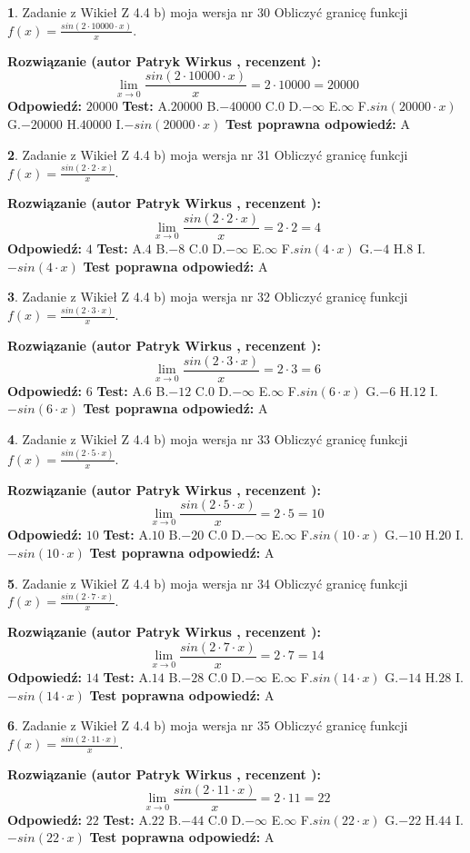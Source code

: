 \documentclass[12pt, a4paper]{article}
\theoremstyle{definition} %
\newtheorem{zad}{}
\newcommand{\zadStart}[1]{\begin{zad}#1\newline}
\newcommand{\zadStop}{\end{zad}}
\newcommand{\rozwStart}[2]{\noindent \textbf{Rozwiązanie (autor #1 , recenzent #2): }\newline}
\newcommand{\rozwStop}{\newline}
\newcommand{\odpStart}{\noindent \textbf{Odpowiedź:}\newline}
\newcommand{\odpStop}{\newline}
\newcommand{\testStart}{\noindent \textbf{Test:}\newline}
\newcommand{\testStop}{\newline}
\newcommand{\kluczStart}{\noindent \textbf{Test poprawna odpowiedź:}\newline}
\newcommand{\kluczStop}{\newline}
\begin{document}
\zadStart{Zadanie z Wikieł Z 4.4 b) moja wersja nr 30}
Obliczyć granicę funkcji $f(x)=\frac{sin(2 \cdot10000\cdot x)}{x}$.
\zadStop
\rozwStart{Patryk Wirkus}{}
$$\lim\limits_{x\to 0}\frac{sin(2 \cdot 10000\cdot x)}{x}=
2 \cdot 10000 = 20000$$
\rozwStop
\odpStart
$20000$
\odpStop
\testStart
A.$20000$
B.$-40000$
C.$0$
D.$-\infty$
E.$\infty$
F.$sin(20000\cdot x)$
G.$-20000$
H.$40000$
I.$-sin(20000\cdot x)$
\testStop
\kluczStart
A
\kluczStop



\zadStart{Zadanie z Wikieł Z 4.4 b) moja wersja nr 31}
Obliczyć granicę funkcji $f(x)=\frac{sin(2 \cdot2\cdot x)}{x}$.
\zadStop
\rozwStart{Patryk Wirkus}{}
$$\lim\limits_{x\to 0}\frac{sin(2 \cdot 2\cdot x)}{x}=
2 \cdot 2 = 4$$
\rozwStop
\odpStart
$4$
\odpStop
\testStart
A.$4$
B.$-8$
C.$0$
D.$-\infty$
E.$\infty$
F.$sin(4\cdot x)$
G.$-4$
H.$8$
I.$-sin(4\cdot x)$
\testStop
\kluczStart
A
\kluczStop



\zadStart{Zadanie z Wikieł Z 4.4 b) moja wersja nr 32}
Obliczyć granicę funkcji $f(x)=\frac{sin(2 \cdot3\cdot x)}{x}$.
\zadStop
\rozwStart{Patryk Wirkus}{}
$$\lim\limits_{x\to 0}\frac{sin(2 \cdot 3\cdot x)}{x}=
2 \cdot 3 = 6$$
\rozwStop
\odpStart
$6$
\odpStop
\testStart
A.$6$
B.$-12$
C.$0$
D.$-\infty$
E.$\infty$
F.$sin(6\cdot x)$
G.$-6$
H.$12$
I.$-sin(6\cdot x)$
\testStop
\kluczStart
A
\kluczStop



\zadStart{Zadanie z Wikieł Z 4.4 b) moja wersja nr 33}
Obliczyć granicę funkcji $f(x)=\frac{sin(2 \cdot5\cdot x)}{x}$.
\zadStop
\rozwStart{Patryk Wirkus}{}
$$\lim\limits_{x\to 0}\frac{sin(2 \cdot 5\cdot x)}{x}=
2 \cdot 5 = 10$$
\rozwStop
\odpStart
$10$
\odpStop
\testStart
A.$10$
B.$-20$
C.$0$
D.$-\infty$
E.$\infty$
F.$sin(10\cdot x)$
G.$-10$
H.$20$
I.$-sin(10\cdot x)$
\testStop
\kluczStart
A
\kluczStop



\zadStart{Zadanie z Wikieł Z 4.4 b) moja wersja nr 34}
Obliczyć granicę funkcji $f(x)=\frac{sin(2 \cdot7\cdot x)}{x}$.
\zadStop
\rozwStart{Patryk Wirkus}{}
$$\lim\limits_{x\to 0}\frac{sin(2 \cdot 7\cdot x)}{x}=
2 \cdot 7 = 14$$
\rozwStop
\odpStart
$14$
\odpStop
\testStart
A.$14$
B.$-28$
C.$0$
D.$-\infty$
E.$\infty$
F.$sin(14\cdot x)$
G.$-14$
H.$28$
I.$-sin(14\cdot x)$
\testStop
\kluczStart
A
\kluczStop



\zadStart{Zadanie z Wikieł Z 4.4 b) moja wersja nr 35}
Obliczyć granicę funkcji $f(x)=\frac{sin(2 \cdot11\cdot x)}{x}$.
\zadStop
\rozwStart{Patryk Wirkus}{}
$$\lim\limits_{x\to 0}\frac{sin(2 \cdot 11\cdot x)}{x}=
2 \cdot 11 = 22$$
\rozwStop
\odpStart
$22$
\odpStop
\testStart
A.$22$
B.$-44$
C.$0$
D.$-\infty$
E.$\infty$
F.$sin(22\cdot x)$
G.$-22$
H.$44$
I.$-sin(22\cdot x)$
\testStop
\kluczStart
A
\kluczStop
\end{document}
